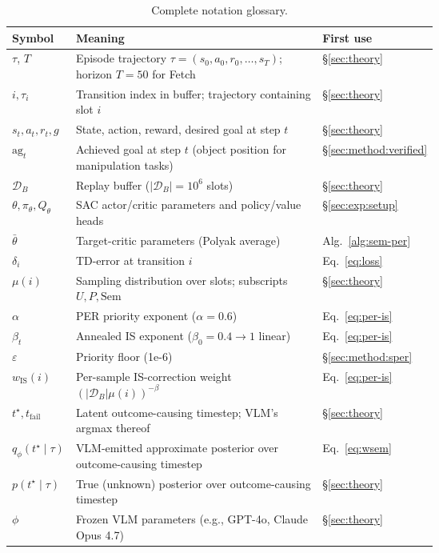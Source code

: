 \begin{table}[t]
\centering
\footnotesize
\caption{Complete notation glossary.}
\label{tab:notation}
\begin{tabular}{l p{0.62\linewidth} l}
\toprule
Symbol & Meaning & First use \\
\midrule
$\tau$, $T$ & Episode trajectory $\tau=(s_0,a_0,r_0,\dots,s_T)$; horizon $T\!=\!50$ for Fetch & \S\ref{sec:theory} \\
$i, \tau_i$ & Transition index in buffer; trajectory containing slot $i$ & \S\ref{sec:theory} \\
$s_t,a_t,r_t,g$ & State, action, reward, desired goal at step $t$ & \S\ref{sec:theory} \\
$\text{ag}_t$ & Achieved goal at step $t$ (object position for manipulation tasks) & \S\ref{sec:method:verified} \\
$\mathcal{D}_B$ & Replay buffer ($|\mathcal{D}_B|=10^6$ slots) & \S\ref{sec:theory} \\
$\theta,\pi_\theta,Q_\theta$ & SAC actor/critic parameters and policy/value heads & \S\ref{sec:exp:setup} \\
$\bar\theta$ & Target-critic parameters (Polyak average) & Alg.~\ref{alg:sem-per} \\
$\delta_i$ & TD-error at transition $i$ & Eq.~\eqref{eq:loss} \\
$\mu(i)$ & Sampling distribution over slots; subscripts $U,P,\text{Sem}$ & \S\ref{sec:theory} \\
$\alpha$ & PER priority exponent ($\alpha=0.6$) & Eq.~\eqref{eq:per-is} \\
$\beta_t$ & Annealed IS exponent ($\beta_0=0.4\to 1$ linear) & Eq.~\eqref{eq:per-is} \\
$\varepsilon$ & Priority floor (1e-6) & \S\ref{sec:method:sper} \\
$w_{\text{IS}}(i)$ & Per-sample IS-correction weight $(|\mathcal{D}_B|\mu(i))^{-\beta}$ & Eq.~\eqref{eq:per-is} \\
$t^\star,t_{\text{fail}}$ & Latent outcome-causing timestep; VLM's argmax thereof & \S\ref{sec:theory} \\
$q_\phi(t^\star\!\mid\!\tau)$ & VLM-emitted approximate posterior over outcome-causing timestep & Eq.~\eqref{eq:wsem} \\
$p(t^\star\!\mid\!\tau)$ & True (unknown) posterior over outcome-causing timestep & \S\ref{sec:theory} \\
$\phi$ & Frozen VLM parameters (e.g., GPT-4o, Claude Opus 4.7) & \S\ref{sec:theory} \\

\end{tabular}
\end{table}
